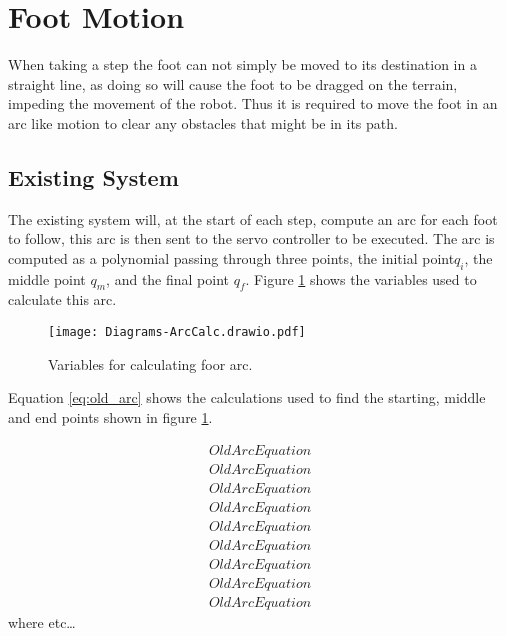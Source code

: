         \newpage
    \section{Foot Motion} \label{sec:arc_generation}
        When taking a step the foot can not simply be moved to its destination in a straight line, as doing so will cause the foot to be dragged on the terrain,
        impeding the movement of the robot. Thus it is required to move the foot in an arc like motion to clear any obstacles that might be in its path.


        \subsection{Existing System}
            The existing system will, at the start of each step, compute an arc for each foot to follow, this arc is then sent to the servo controller
            to be executed. The arc is computed as a polynomial passing through three points, the initial point\(q_i\), the middle point \(q_m\), and the final point \(q_f\).
            Figure \ref{fig:old_arc_vars} shows the variables used to calculate this arc.
            \begin{figure}[h]
                \centering
                \texttt{[image: Diagrams-ArcCalc.drawio.pdf]}
                \caption{Variables for calculating foor arc.}
                \label{fig:old_arc_vars}
            \end{figure}

            \noindent
            Equation \ref{eq:old_arc} shows the calculations used to find the starting, middle and end points shown in figure \ref{fig:old_arc_vars}.

            \begin{align}\label{eq:old_arc}
                OldArcEquation\\
                OldArcEquation\\
                OldArcEquation\\
                OldArcEquation\\
                OldArcEquation\\
                OldArcEquation\\
                OldArcEquation\\
                OldArcEquation\\
                OldArcEquation
            \end{align}
            where etc\dots

